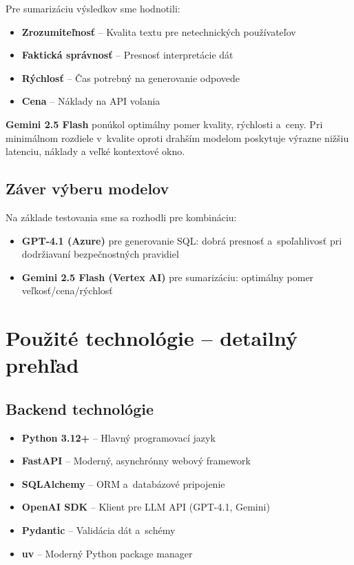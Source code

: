 \documentclass[a4paper, 12pt]{article}
\begin{document}
Pre sumarizáciu výsledkov sme hodnotili:

\begin{itemize}
    \item \textbf{Zrozumiteľnosť} -- Kvalita textu pre netechnických používateľov
    \item \textbf{Faktická správnosť} -- Presnosť interpretácie dát
    \item \textbf{Rýchlosť} -- Čas potrebný na generovanie odpovede
    \item \textbf{Cena} -- Náklady na API volania
\end{itemize}

\textbf{Gemini 2.5 Flash} ponúkol optimálny pomer kvality, rýchlosti a~ceny. Pri minimálnom rozdiele v~kvalite oproti drahším modelom poskytuje výrazne nižšiu latenciu, náklady a veľké kontextové okno.

\subsection{Záver výberu modelov}

Na základe testovania sme sa rozhodli pre kombináciu:

\begin{itemize}
    \item \textbf{GPT-4.1 (Azure)} pre generovanie SQL: dobrá presnosť a~spoľahlivosť pri dodržiavaní bezpečnostných pravidiel
    \item \textbf{Gemini 2.5 Flash (Vertex AI)} pre sumarizáciu: optimálny pomer veľkosť/cena/rýchlosť
\end{itemize}


\clearpage

\section{Použité technológie -- detailný prehľad}

\subsection{Backend technológie}

\begin{itemize}
    \item \textbf{Python 3.12+} -- Hlavný programovací jazyk
    \item \textbf{FastAPI} -- Moderný, asynchrónny webový framework
    \item \textbf{SQLAlchemy} -- ORM a~databázové pripojenie
    \item \textbf{OpenAI SDK} -- Klient pre LLM API (GPT-4.1, Gemini)
    \item \textbf{Pydantic} -- Validácia dát a~schémy
    \item \textbf{uv} -- Moderný Python package manager
\end{itemize}
\end{document}
